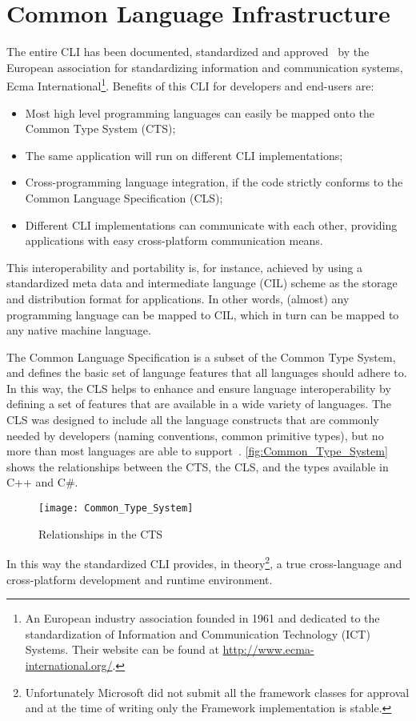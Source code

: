 \section{Common Language Infrastructure}
\label{sec:cts}
The entire CLI has been documented, standardized and approved~\cite{Ecma-335} by the European association for standardizing information and communication systems, Ecma International\footnote{An European industry association founded in 1961 and dedicated to the standardization of Information and Communication Technology (ICT) Systems.
Their website can be found at \url{http://www.ecma-international.org/}.}.
Benefits of this CLI for developers and end-users are:

\begin{itemize}[noitemsep]
  \item Most high level programming languages can easily be mapped onto the Common Type System (CTS);
  \item The same application will run on different CLI implementations;
  \item Cross-programming language integration, if the code strictly conforms to the Common Language Specification (CLS);
  \item Different CLI implementations can communicate with each other, providing applications with easy cross-platform communication means.
\end{itemize}

This interoperability and portability is, for instance, achieved by using a standardized meta data and intermediate language (CIL) scheme as the storage and distribution format for applications.
In other words, (almost) any programming language can be mapped to CIL, which in turn can be mapped to any native machine language.

The Common Language Specification is a subset of the Common Type System, and defines the basic set of language features that all \dotNET languages should adhere to.
In this way, the CLS helps to enhance and ensure language interoperability by defining a set of features that are available in a wide variety of languages.
The CLS was designed to include all the language constructs that are commonly needed by developers 
(\eg naming conventions, common primitive types), but no more than most languages are able to support~\cite{Microsoft03-2}.
\autoref{fig:Common_Type_System} shows the relationships between the CTS, the CLS, and the types available in C++ and C\#.
\begin{figure}[htbp]
 \centering
 \texttt{[image: Common\_Type\_System]}
 \caption{Relationships in the CTS}
 \label{fig:Common_Type_System}
\end{figure}
In this way the standardized CLI provides, in theory\footnote{Unfortunately Microsoft did not submit all the framework classes for approval and at the time of writing only the \dotNET Framework implementation is stable.}, a true cross-language and cross-platform development and runtime environment.

